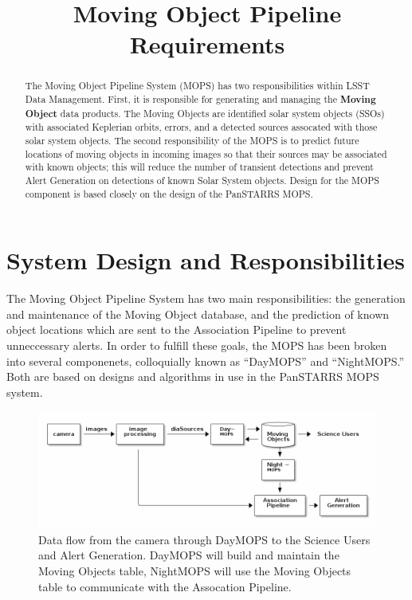 \documentclass[12pt,preprint]{aastex}
\begin{document}
\title{Moving Object Pipeline Requirements}

\author{}

\begin{abstract}

The Moving Object Pipeline System (MOPS) has two responsibilities
within LSST Data Management.  First, it is responsible for generating
and managing the \textbf{Moving Object} data products.  The Moving
Objects are identified solar system objects (SSOs) with associated
Keplerian orbits, errors, and a detected sources assocated with those
solar system objects.  The second responsibility of the MOPS is to
predict future locations of moving objects in incoming images so that
their sources may be associated with known objects; this will reduce
the number of transient detections and prevent Alert Generation on
detections of known Solar System objects.  Design for the MOPS
component is based closely on the design of the PanSTARRS MOPS.

\end{abstract}

\tableofcontents


\section{System Design and Responsibilities}

The Moving Object Pipeline System has two main responsibilities: the
generation and maintenance of the Moving Object database, and the
prediction of known object locations which are sent to the Association
Pipeline to prevent unneccessary alerts.  In order to fulfill these
goals, the MOPS has been broken into several componenets, colloquially
known as ``DayMOPS'' and ``NightMOPS.''  Both are based on designs and
algorithms in use in the PanSTARRS MOPS system.
 

\begin{figure}[!ht]
\begin{center}
  \includegraphics[width=13cm]{illustrations/mopsWithinLsst.png}
\end{center}
\caption{ Data flow from the camera through DayMOPS to the Science
  Users and Alert Generation.  DayMOPS will build and maintain the
  Moving Objects table, NightMOPS will use the Moving Objects table to
  communicate with the Assocation Pipeline.  }
\label{mopsWithinLsst}
\end{figure}
\end{document}
